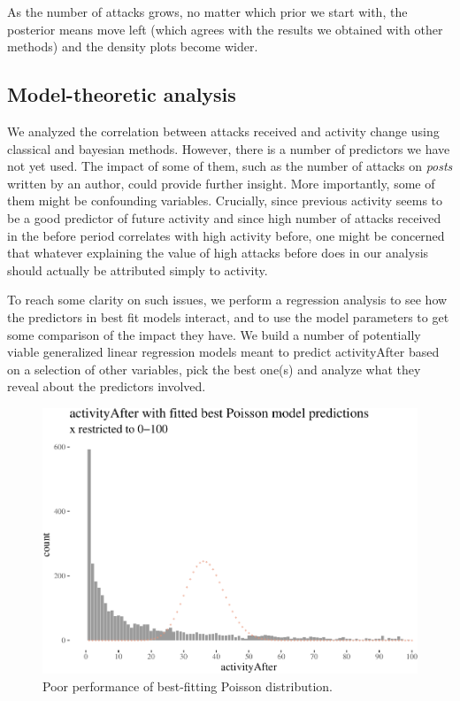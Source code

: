 \documentclass[
  10pt,
  dvipsnames]{scrartcl}
\begin{document}
As the number of attacks grows, no matter which prior we start with, the
posterior means move left (which agrees with the results we obtained
with other methods) and the density plots become wider.

\normalsize

\subsection{Model-theoretic analysis}

\normalsize

We analyzed the correlation between attacks received and activity change
using classical and bayesian methods. However, there is a number of
predictors we have not yet used. The impact of some of them, such as the
number of attacks on \emph{posts} written by an author, could provide
further insight. More importantly, some of them might be confounding
variables. Crucially, since previous activity seems to be a good
predictor of future activity and since high number of attacks received
in the \textsf{before} period correlates with high activity before, one
might be concerned that whatever explaining the value of high attacks
before does in our analysis should actually be attributed simply to
activity.

To reach some clarity on such issues, we perform a regression analysis
to see how the predictors in best fit models interact, and to use the
model parameters to get some comparison of the impact they have. We
build a number of potentially viable generalized linear regression
models meant to predict \textsf{activityAfter} based on a selection of
other variables, pick the best one(s) and analyze what they reveal about
the predictors involved.

\footnotesize

\normalsize

\begin{figure}[H]

\begin{center}\includegraphics[width=1\linewidth]{testPatrycja_files/figure-latex/unnamed-chunk-32-1} \end{center}
\caption{Poor performance of best-fitting Poisson distribution.}
\label{fig:poissBad}
\end{figure}
\end{document}
